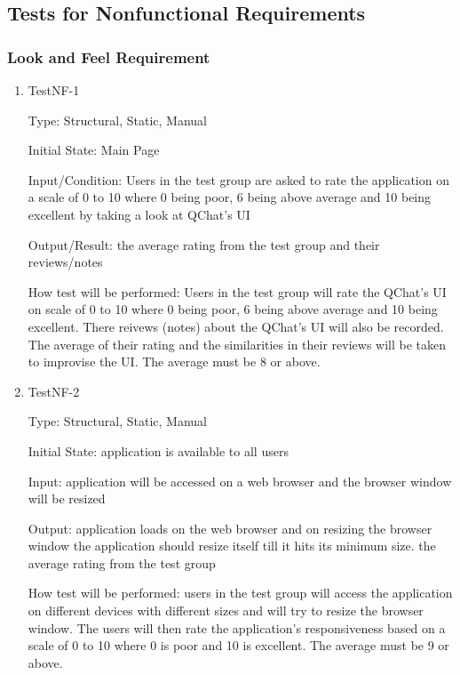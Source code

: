 \documentclass[12pt, titlepage]{article}
\begin{document}
\subsection{Tests for Nonfunctional Requirements}

\subsubsection{Look and Feel Requirement }
		

\begin{enumerate}

\item{TestNF-1\\}

Type: Structural, Static, Manual

Initial State: Main Page
					
Input/Condition: Users in the test group are asked to rate the application on a scale of 0 to 10 where 0 being poor, 6 being above average and 10 being excellent by taking a look at QChat’s UI
					
Output/Result: the average rating from the test group and their reviews/notes

How test will be performed: Users in the test group will rate the QChat’s UI on scale of 0 to 10 where 0 being poor, 6 being above average and 10 being excellent. There reivews (notes) about the QChat’s UI will also be recorded. The average of their rating and the similarities in their reviews will be taken to improvise the UI. The average must be 8 or above.  

\item{TestNF-2\\}

Type: Structural, Static, Manual
					
Initial State: application is available to all users
					
Input: application will be accessed on a web browser and the browser window will be resized
					
Output: application loads on the web browser and on resizing the browser window the application should resize itself till it hits its minimum size. the average rating from the test group
					
How test will be performed: users in the test group will access the application on different devices with different sizes and will try to resize the browser window. The users will then rate the application’s responsiveness based on a scale of 0 to 10 where 0 is poor and 10 is excellent. The average must be 9 or above. 

\end{enumerate}
\end{document}
